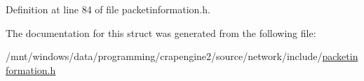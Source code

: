 Definition at line 84 of file packetinformation.\+h.



The documentation for this struct was generated from the following file\+:\begin{DoxyCompactItemize}
\item 
/mnt/windows/data/programming/crapengine2/source/network/include/\hyperlink{packetinformation_8h}{packetinformation.\+h}\end{DoxyCompactItemize}
